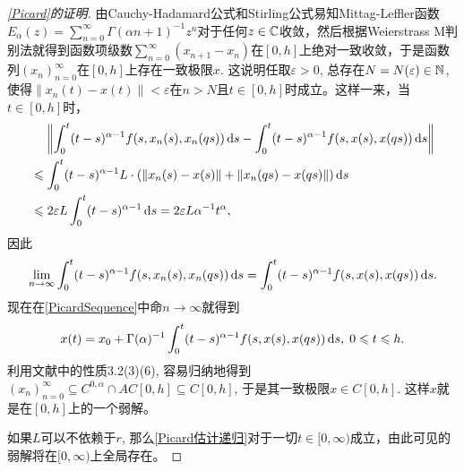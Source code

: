 \begin{proof}[\cref{Picard}的证明]
    由Cauchy-Hadamard公式和Stirling公式易知Mittag-Leffler函数\cite{book}$E_\alpha(z)=\sum_{n=0}^{\infty}\Gamma(\alpha n+1)^{-1}z^n$对于任何$z\in \mathbb{C}$收敛，然后根据Weierstrass M判别法就得到函数项级数$\sum_{n=0}^\infty \left(x_{n+1}-x_n\right)$在$[0,h]$上绝对一致收敛，于是函数列$\left(x_n\right)_{n=0}^\infty$在$[0,h]$上存在一致极限$x$. 这说明任取$\varepsilon>0$, 总存在$N=N(\varepsilon)\in \mathbb{N}$, 使得$\left\|x_n(t)-x(t)\right\|<\varepsilon$在$n>N$且$t\in [0,h]$时成立。这样一来，当$t\in [0,h]$时，
    \begin{align*}
        &\relphantom{\leqslant} \left\| \int_0^t (t-s)^{\alpha-1} f(s,x_n(s),x_n(qs))\differential s - \int_0^t (t-s)^{\alpha-1} f(s,x(s),x(qs))\differential s \right\|\\
        &\leqslant \int_0^t (t-s)^{\alpha-1} L\cdot\left(\left\|x_n(s)-x(s)\right\|+\left\|x_n(qs)-x(qs)\right\|\right) \differential s\\
        &\leqslant 2\varepsilon L\int_0^t (t-s)^{\alpha-1}\differential s = 2\varepsilon L\alpha^{-1}t^\alpha,
    \end{align*}
    因此
    \begin{equation*}
        \lim_{n\to\infty} \int_0^t (t-s)^{\alpha-1} f(s,x_n(s),x_n(qs))\mathop{}\!\mathrm{d} s = \int_0^t (t-s)^{\alpha-1} f(s,x(s),x(qs))\mathop{}\!\mathrm{d} s.
    \end{equation*}
    现在在\cref{PicardSequence}中命$n\to\infty$就得到
    \begin{equation*}
        x(t)=x_0 + \Gamma(\alpha)^{-1}\int_0^t (t-s)^{\alpha-1} f(s,x(s),x(qs))\mathop{}\!\mathrm{d} s,\;0\leqslant t\leqslant h.
    \end{equation*}
    利用文献中的性质3.2(3)(6), 容易归纳地得到$\left(x_n\right)_{n=0}^\infty \subseteq C^{0,\alpha} \cap AC [0,h] \subseteq C[0,h]$, 于是其一致极限$x\in C[0,h]$. 这样$x$就是\mainEquation 在$[0,h]$上的一个弱解。

    如果$L$可以不依赖于$r$, 那么\cref{Picard估计递归}对于一切$t\in [0,\infty)$成立，由此可见\mainEquation 的弱解将在$[0,\infty)$上全局存在。


\end{proof}
